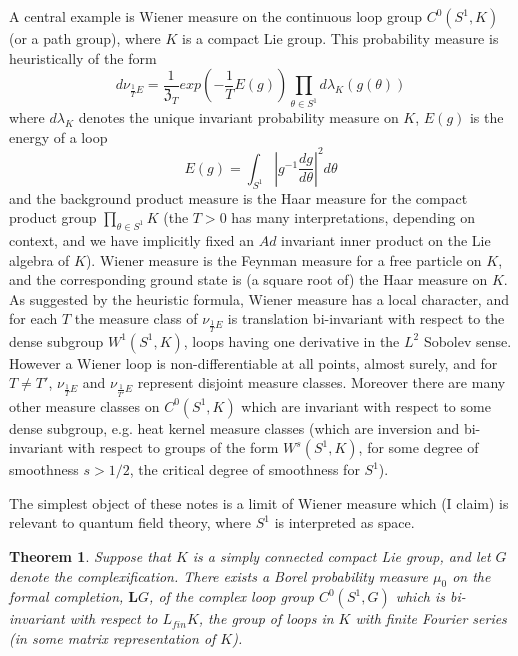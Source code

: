 \documentclass{amsart}
\newtheorem{theorem}{Theorem}[section]
\theoremstyle{conjecture}
\theoremstyle{definition}
\theoremstyle{question}
\theoremstyle{questions}
\theoremstyle{remark}
\theoremstyle{remarks}
\theoremstyle{example}
\numberwithin{equation}{section}
\begin{document}
A central example is Wiener measure on the continuous loop group $C^0(S^1,K)$ (or a path group), where $K$ is a compact Lie group. 
This probability measure is heuristically of the form
$$d\nu_{\frac 1T E}=\frac{1}{\mathfrak Z_T} exp(-\frac 1T E(g))\prod_{\theta\in S^1}d\lambda_K(g(\theta))$$
where $d\lambda_K$ denotes the unique invariant probability measure on $K$, $E(g)$ is the energy of a loop
$$E(g)=\int_{S^1}|g^{-1}\frac{dg}{d\theta}|^2d\theta$$
and the background product measure is the Haar measure for the compact product group $\prod_{\theta\in S^1} K$ (the $T>0$ has many interpretations, depending on context, and we have implicitly fixed an $Ad$ invariant inner product on the Lie algebra of $K$). Wiener measure is the Feynman measure for a free particle on $K$, and the corresponding ground state is (a square root of) the Haar measure on $K$. As suggested by the heuristic formula, Wiener measure has a local character, and for each $T$ the measure class of $\nu_{\frac 1T E}$ is translation bi-invariant with respect to the dense subgroup 
$W^1(S^1,K)$, loops having one derivative in the $L^2$ Sobolev sense. However a Wiener loop is non-differentiable at all points, almost surely,
and for $T\ne T'$, $\nu_{\frac 1T E}$ and $\nu_{\frac{1}{T'} E}$ represent disjoint measure classes. Moreover there
are many other measure classes on $C^0(S^1,K)$ which are invariant with respect to some dense subgroup, e.g. heat kernel measure classes (which are inversion and bi-invariant
with respect to groups of the form $W^s(S^1,K)$, for some degree of smoothness $s>1/2$, the critical degree of smoothness for $S^1$). 

The simplest object of these notes is a limit of Wiener measure which (I claim) is relevant to quantum field theory, where $S^1$ is interpreted as space.
  
\begin{theorem}\label{theorem1}Suppose that $K$ is a simply connected
compact Lie group, and let $G$ denote the complexification. There
exists a Borel probability measure $\mu_0$ on the formal completion,
$\mathbf LG$, of the complex loop group $C^{0}(S^1,G)$ which is bi-invariant
with respect to $L_{fin}K$, the group of loops in $K$ with finite Fourier series
(in some matrix representation of $K$). 
\end{theorem}
\end{document}
